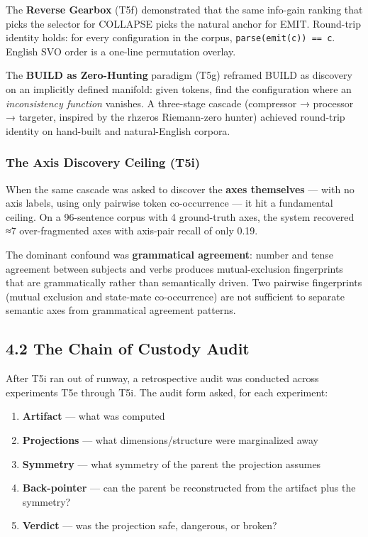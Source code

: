 \documentclass[
  twocolumn,
  10pt,
  a4paper]{article}
\providecommand{\tightlist}{%
  \setlength{\itemsep}{0pt}\setlength{\parskip}{0pt}}
\begin{document}
The \textbf{Reverse Gearbox} (T5f) demonstrated that the same info-gain
ranking that picks the selector for COLLAPSE picks the natural anchor
for EMIT. Round-trip identity holds: for every configuration in the
corpus, \texttt{parse(emit(c))\ ==\ c}. English SVO order is a one-line
permutation overlay.

The \textbf{BUILD as Zero-Hunting} paradigm (T5g) reframed BUILD as
discovery on an implicitly defined manifold: given tokens, find the
configuration where an \emph{inconsistency function} vanishes. A
three-stage cascade (compressor → processor → targeter, inspired by the
rhzeros Riemann-zero hunter) achieved round-trip identity on hand-built
and natural-English corpora.

\hypertarget{the-axis-discovery-ceiling-t5i}{%
\subsubsection{The Axis Discovery Ceiling
(T5i)}\label{the-axis-discovery-ceiling-t5i}}

When the same cascade was asked to discover the \textbf{axes themselves}
--- with no axis labels, using only pairwise token co-occurrence --- it
hit a fundamental ceiling. On a 96-sentence corpus with 4 ground-truth
axes, the system recovered ≈7 over-fragmented axes with axis-pair recall
of only 0.19.

The dominant confound was \textbf{grammatical agreement}: number and
tense agreement between subjects and verbs produces mutual-exclusion
fingerprints that are grammatically rather than semantically driven. Two
pairwise fingerprints (mutual exclusion and state-mate co-occurrence)
are not sufficient to separate semantic axes from grammatical agreement
patterns.

\hypertarget{the-chain-of-custody-audit}{%
\subsection{4.2 The Chain of Custody
Audit}\label{the-chain-of-custody-audit}}

After T5i ran out of runway, a retrospective audit was conducted across
experiments T5e through T5i. The audit form asked, for each experiment:

\begin{enumerate}
\def\labelenumi{\arabic{enumi}.}
\tightlist
\item
  \textbf{Artifact} --- what was computed
\item
  \textbf{Projections} --- what dimensions/structure were marginalized
  away
\item
  \textbf{Symmetry} --- what symmetry of the parent the projection
  assumes
\item
  \textbf{Back-pointer} --- can the parent be reconstructed from the
  artifact plus the symmetry?
\item
  \textbf{Verdict} --- was the projection safe, dangerous, or broken?
\end{enumerate}
\end{document}
